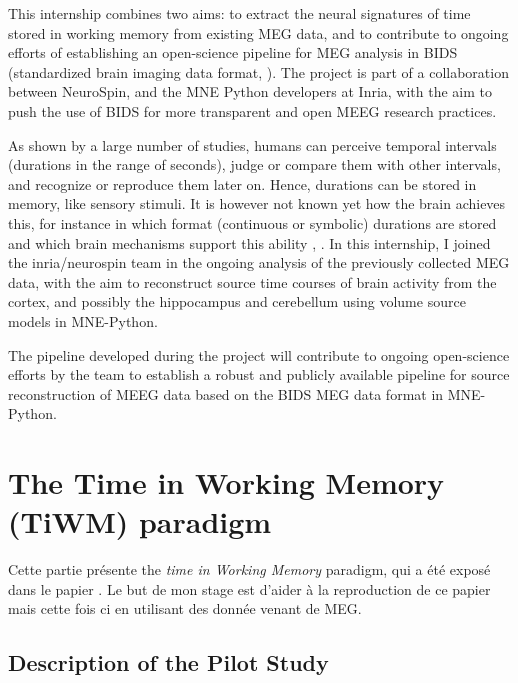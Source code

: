 This internship combines two aims: to extract the neural signatures of time stored in working memory from existing MEG data, and to contribute to ongoing efforts of establishing an open-science pipeline for MEG analysis in BIDS (standardized brain imaging data format, \cite{gorgolewski2016brain}). The project is part of a collaboration between NeuroSpin, and the MNE Python developers at Inria, with the aim to push the use of BIDS for more transparent and open MEEG research practices.

As shown by a large number of studies, humans can perceive temporal intervals (durations in the range of seconds), judge or compare them with other intervals, and recognize or reproduce them later on. Hence, durations can be stored in memory, like sensory stimuli. It is however not known yet how the brain achieves this, for instance in which format (continuous or symbolic) durations are stored and which brain mechanisms support this ability \cite{polti2018effect}, \cite{teki2014working}. In this internship, I joined the inria/neurospin team in the ongoing analysis of the previously collected MEG data, with the aim to reconstruct source time courses of brain activity from the cortex, and possibly the hippocampus and cerebellum \cite{gauthier2020hippocampal} using volume source models in MNE-Python.

The pipeline developed during the project will contribute to ongoing open-science
efforts by the team to establish a robust and publicly available pipeline for source
reconstruction of MEEG data based on the BIDS MEG data format in MNE-Python.




\section{The Time in Working Memory (TiWM) paradigm}

Cette partie présente the \textit{time in Working Memory} paradigm, qui a été exposé dans le papier \cite{herbst2021abstracting}. Le but de mon stage est d'aider à la reproduction de ce papier mais cette fois ci en utilisant des donnée venant de MEG.

\subsection{Description of the Pilot Study}

